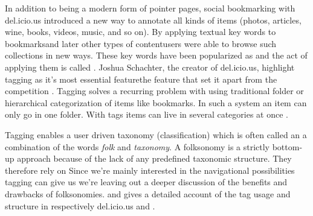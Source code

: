 In addition to being a modern form of pointer pages, social bookmarking
with del.icio.us introduced a new way to annotate all kinds of
items (photos, articles, wine, books, videos, music, and so on).
By applying textual key words to
bookmarks\dash{}and later other types of content\dash{}users were able to
browse such collections in new ways. These key words have been popularized as
 and the act of applying them is called %
.
Joshua Schachter, the creator of del.icio.us, highlight tagging as it's most
essential feature\dash{}the feature that set it apart from the competition
\cite[]{livingston07}. Tagging solves a recurring problem with
using traditional folder or hierarchical categorization of items like
bookmarks. In such a system an item can only go in one folder. With
tags items can live in several categories at once
\citep[]{weinberger07}.

Tagging enables a user driven taxonomy (classification)
which is often called an \dash{}a combination of the words
\emph{folk} and \emph{taxonomy}. A folksonomy is a strictly bottom-up
approach because of the lack of any predefined taxonomic structure. They
therefore rely on 
Since we're mainly interested in the navigational possibilities tagging can
give us we're leaving out a deeper discussion of the benefits and drawbacks
of folksonomies. \citet{golder06} and \citet{marlow06} gives a detailed
account of the tag usage and structure in respectively del.icio.us and
%
.

